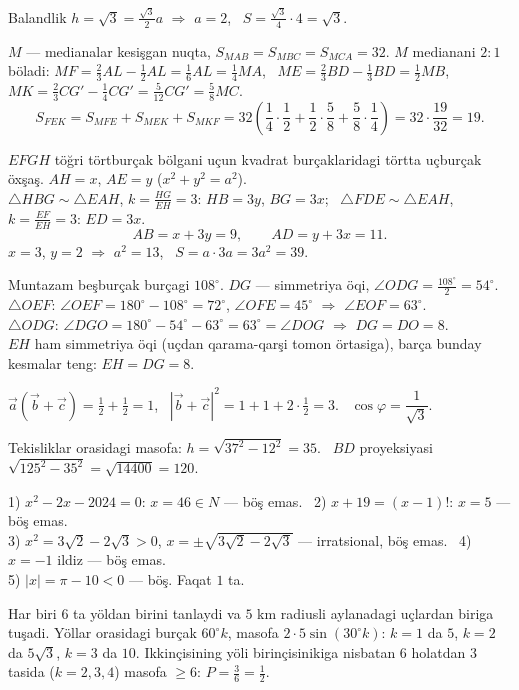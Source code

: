 Balandlik $h=\sqrt3=\frac{\sqrt3}2a$ $\Rightarrow$ $a=2$, \ $S=\frac{\sqrt3}4\cdot4=\sqrt3$.

$M$ — medianalar kesişgan nuqta, $S_{MAB}=S_{MBC}=S_{MCA}=32$. $M$ medianani $2:1$ böladi:
$MF=\frac23AL-\frac12AL=\frac16AL=\frac14MA$, \ $ME=\frac23BD-\frac13BD=\frac12MB$, \ $MK=\frac23CG'-\frac14CG'=\frac5{12}CG'=\frac58MC$.
\[S_{FEK}=S_{MFE}+S_{MEK}+S_{MKF}=32\left(\frac14\cdot\frac12+\frac12\cdot\frac58+\frac58\cdot\frac14\right)=32\cdot\frac{19}{32}=19.\]

$EFGH$ töğri törtburçak bölgani uçun kvadrat burçaklaridagi törtta uçburçak öxşaş. $AH=x$, $AE=y$ ($x^2+y^2=a^2$).\\
$\triangle HBG\sim\triangle EAH$, $k=\frac{HG}{EH}=3$: $HB=3y$, $BG=3x$; \ $\triangle FDE\sim\triangle EAH$, $k=\frac{EF}{EH}=3$: $ED=3x$.
\[AB=x+3y=9,\qquad AD=y+3x=11.\]
$x=3$, $y=2$ $\Rightarrow$ $a^2=13$, \ $S=a\cdot3a=3a^2=39$.

Muntazam beşburçak burçagi $108^\circ$. $DG$ — simmetriya öqi, $\angle ODG=\frac{108^\circ}2=54^\circ$.\\
$\triangle OEF$: $\angle OEF=180^\circ-108^\circ=72^\circ$, $\angle OFE=45^\circ$ $\Rightarrow$ $\angle EOF=63^\circ$.\\
$\triangle ODG$: $\angle DGO=180^\circ-54^\circ-63^\circ=63^\circ=\angle DOG$ $\Rightarrow$ $DG=DO=8$.\\
$EH$ ham simmetriya öqi (uçdan qarama-qarşi tomon örtasiga), barça bunday kesmalar teng: $EH=DG=8$.

$\vec a(\vec b+\vec c)=\frac12+\frac12=1$, \ $|\vec b+\vec c|^2=1+1+2\cdot\frac12=3$. \ $\cos\varphi=\dfrac1{\sqrt3}$.

Tekisliklar orasidagi masofa: $h=\sqrt{37^2-12^2}=35$. \ $BD$ proyeksiyasi $\sqrt{125^2-35^2}=\sqrt{14400}=120$.

1) $x^2-2x-2024=0$: $x=46\in N$ — böş emas. \ 2) $x+19=(x-1)!$: $x=5$ — böş emas.\\
3) $x^2=3\sqrt2-2\sqrt3>0$, $x=\pm\sqrt{3\sqrt2-2\sqrt3}$ — irratsional, böş emas. \ 4) $x=-1$ ildiz — böş emas.\\
5) $|x|=\pi-10<0$ — böş. \quad Faqat $1$ ta.

Har biri $6$ ta yöldan birini tanlaydi va $5$ km radiusli aylanadagi uçlardan biriga tuşadi. Yöllar orasidagi burçak $60^\circ k$, masofa $2\cdot5\sin(30^\circ k)$: $k=1$ da $5$, $k=2$ da $5\sqrt3$, $k=3$ da $10$. Ikkinçisining yöli birinçisinikiga nisbatan $6$ holatdan $3$ tasida ($k=2,3,4$) masofa $\ge6$:
$P=\frac36=\frac12$.

